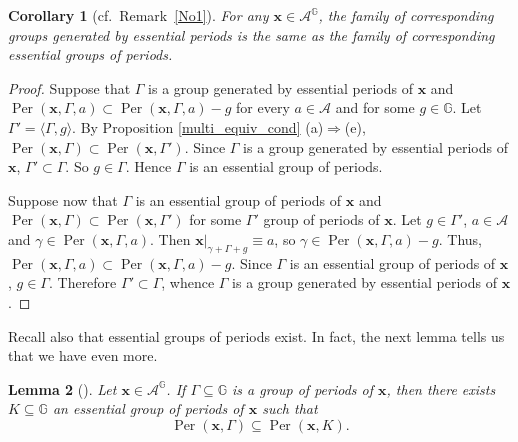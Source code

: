 \documentclass[leqno,a4paper,12pt]{article}
\newtheorem{Th}{Theorem}[section]
\newtheorem{Lemma}[Th]{Lemma}
\newtheorem{Cor}[Th]{Corollary}
\theoremstyle{definition}
\newcommand{\divides}{\mid}
\newcommand{\Per}{\operatorname{Per}\nolimits}
\newcommand{\Z}{{\mathbb{Z}}}
\newcommand{\N}{{\mathbb{N}}}
\newcommand{\OK}{\mathcal{O}_K}
\newcommand{\G}{\mathbb{G}}
\begin{document}
\begin{Cor}[cf.\ Remark~\ref{No1}]\label{essential_multi}
For any $\bm{x}\in\mathcal{A}^\G$, the family of corresponding groups generated by essential periods is the same as the family of corresponding essential groups of periods.
\end{Cor}
\begin{proof}
Suppose that $\Gamma$ is a group generated by essential periods of $\bm{x}$ and $\Per(\bm{x},\Gamma,a)\subset\Per(\bm{x},\Gamma,a)-g$ for every $a\in\mathcal{A}$ and for some $g\in\G$. Let $\Gamma'=\langle\Gamma,g\rangle$. By Proposition \ref{multi_equiv_cond} (a)$\Rightarrow$(e), $\Per(\bm{x},\Gamma)\subset\Per(\bm{x},\Gamma')$. Since $\Gamma$ is a group generated by essential periods of $\bm{x}$, $\Gamma'\subset\Gamma$. So $g\in\Gamma$. Hence $\Gamma$ is an essential group of periods.

Suppose now that $\Gamma$ is an essential group of periods of $\bm{x}$ and $\Per(\bm{x},\Gamma)\subset\Per(\bm{x},\Gamma')$ for some $\Gamma'$ group of periods of $\bm{x}$. Let $g\in\Gamma'$, $a\in\mathcal{A}$ and $\gamma\in\Per(\bm{x},\Gamma,a)$. Then $\bm{x}|_{\gamma+\Gamma+g}\equiv a$, so $\gamma\in\Per(\bm{x},\Gamma,a)-g$. Thus, $\Per(\bm{x},\Gamma,a)\subset\Per(\bm{x},\Gamma,a)-g$. Since $\Gamma$ is an essential group of periods of $\bm{x}$, $g\in\Gamma$. Therefore $\Gamma'\subset\Gamma$, whence $\Gamma$ is a group generated by essential periods of $\bm{x}$.
\end{proof}

Recall also that essential groups of periods exist. In fact, the next lemma tells us that we have even more.
\begin{Lemma}[{\cite[Lemma 7]{MR2427048}}]
Let $\bm{x} \in \mathcal{A}^{\G}$. If $\Gamma \subseteq \G$ is a group of periods of $\bm{x}$, then there exists $K \subseteq \G$ an essential group of periods of $\bm{x}$ such that \[\operatorname{Per}(\bm{x}, \Gamma) \subseteq \operatorname{Per}(\bm{x}, K).\]
\end{Lemma}

\end{document}
